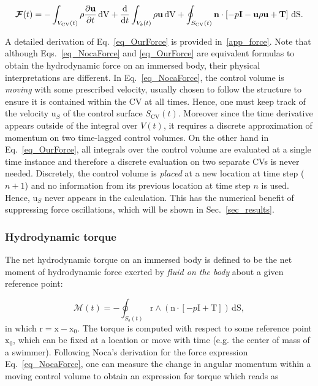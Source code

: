 \documentclass[review]{elsarticle}
\renewcommand \d [2]{\frac{{\rm d} #1}{{\rm d} #2}}
\newcommand \D [2]{\frac{\partial #1}{\partial #2}}
\renewcommand{\vec}[1]{\bm{\mathrm{#1}}}
\def \x{\vec{x}}
\def \n{\vec{n}}
\def \r{\vec{r}}
\def \u{\vec{u}}
\def \uS{\vec{u}_S}
\def \I{\vec{I}}
\def \T{\vec{T}}
\def \cM{\vec{\mathcal{M}}}
\def \Sbt{S_b(t)}
\def  \Scvt{S_\text{CV}(t)}
\def \Vbt{V_b(t)}
\def  \Vcvt{V_\text{CV}(t)}
\def \cF{\vec{\mathcal{F}}}
\def \I{\vec{I}}
\def \n{\vec{n}}
\def \u{\vec{u}}
\def \x{\vec{x}}
\def \dS{\,\mathrm{dS}}
\def \dV{\,\mathrm{dV}}
\def \ndot{\n \cdot}
\def \rcross{\r \wedge}
\begin{document}
\begin{equation}
\label{eq_OurForce}
\cF(t) =  -\int_{\Vcvt} \rho \D{\u}{t} \dV + \d{}{t} \int_{\Vbt} \rho \u \dV + \oint_{\Scvt} \ndot \left[-p \I - \u\rho \u + \T \right] \dS.
\end{equation}

A detailed derivation of Eq.~\eqref{eq_OurForce} is provided in~\ref{app_force}.
Note that although Eqs.~\eqref{eq_NocaForce} and \eqref{eq_OurForce} 
are equivalent formulas to obtain the hydrodynamic force on an immersed body,
their physical interpretations are different. In Eq.~\eqref{eq_NocaForce}, the control 
volume is \emph{moving} with some prescribed velocity, usually chosen to follow 
the structure to ensure it is contained within the CV at all times. Hence, 
one must keep track of the velocity $\uS$ of the control surface $\Scvt$. 
Moreover since the time derivative appears outside of the integral over 
$V(t)$, it requires a discrete approximation of momentum on two 
time-lagged control volumes. On the other hand in Eq.~\eqref{eq_OurForce}, 
all integrals over the control volume are evaluated at a single time instance 
and therefore a discrete evaluation on two separate CVs is never 
needed. Discretely, the control volume is \emph{placed} at a new location 
at time step (${n+1}$) and no information from its previous location at time step
$n$ is used. Hence, $\uS$ never appears in the calculation. This has the numerical
benefit of suppressing force oscillations, which will be shown in 
Sec.~\ref{sec_results}.


\subsubsection{Hydrodynamic torque}

The net hydrodynamic torque on an immersed body is defined to be the net moment of 
hydrodynamic force exerted by \emph{fluid on the body} about a given reference point:

\begin{equation}
\cM(t) =  -\oint_{\Sbt} \rcross \left(\ndot \left[-p \I + \T\right]\right) \dS, \label{eq_torque}
\end{equation}
in which $\r = \x - \x_0$. The torque is computed with respect to
some reference point $\x_0$, which can be fixed at a location or
move with time (e.g. the center of mass of a swimmer). Following Noca's 
derivation for the force expression Eq.~\eqref{eq_NocaForce}, 
one can measure the change in angular momentum within a moving control 
volume to obtain an expression for torque which reads as
\end{document}
